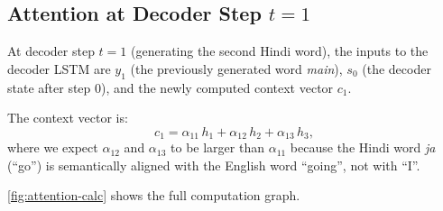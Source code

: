 \documentclass[12pt,a4paper]{article}
\begin{document}
\subsection{Attention at Decoder Step $t=1$}
\label{subsec:attn-t1}

At decoder step $t=1$ (generating the second Hindi word), the inputs
to the decoder LSTM are $y_1$ (the previously generated word
\textit{main}), $s_0$ (the decoder state after step 0), and the
newly computed context vector $c_1$.

The context vector is:
\begin{equation}
  c_1 = \alpha_{11}\,h_1 + \alpha_{12}\,h_2 + \alpha_{13}\,h_3,
  \label{eq:ctx-t1}
\end{equation}
where we expect $\alpha_{12}$ and $\alpha_{13}$ to be larger than
$\alpha_{11}$ because the Hindi word \textit{ja} (``go'') is
semantically aligned with the English word ``going'', not with ``I''.

\cref{fig:attention-calc} shows the full computation graph.
\end{document}
